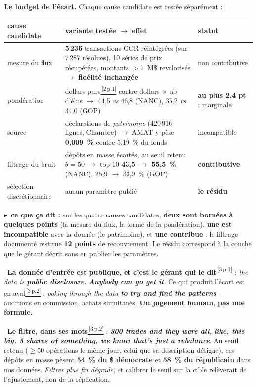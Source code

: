 \documentclass[9pt,a4paper]{extarticle}
\newcommand{\obs}[1]{\vspace{0.2mm}\hangindent=3.4mm\hangafter=0{\color{bleu}\footnotesize\textbullet}~{\small #1}\par\vspace{0.2mm}}
\newcommand{\lire}[1]{{\scriptsize\color{vert}$\blacktriangleright$~\textbf{ce que ça dit :} #1}\par}
\newcommand{\rf}[3]{\href{docs_nanc_gop/#2\#page=#3}{\color{bleu}\textsuperscript{\,[#1\,p.#3]}}}
\newcommand{\sCoop}[1]{\rf{2}{2-cooper-la-regle-du-gerant-20231119.pdf}{#1}}
\newcommand{\sVen}[1]{\rf{3}{3-podcast-Venuto-mecanique-20241206.pdf}{#1}}
\begin{document}
\begin{multicols}{2}
\textbf{Le budget de l'écart.} Chaque cause candidate est testée séparément :
\begin{center}\scriptsize
\begin{tabular}{@{}R{16mm} R{25mm} R{16mm}@{}}
\toprule
cause candidate & variante testée $\to$ effet & statut \\
\midrule
mesure du flux & \textbf{5\,236} transactions OCR réintégrées (sur 7\,287 résolues), 10 séries de prix récupérées, montants \og{}$>$1~M\$\fg{} revalorisés $\to$ \textbf{fidélité inchangée} & non contributive \\
pondération & dollars purs\sCoop{1} contre dollars $\times$ nb d'élus $\to$ 44,5 \emph{vs} 46,8 (NANC), 35,2 \emph{vs} 34,0 (GOP) & \textbf{au plus 2,4 pt} : marginale \\
source & déclarations de \emph{patrimoine} (420\,916 lignes, Chambre) $\to$ AMAT y pèse \textbf{0,009~\%} contre 5,19~\% du fonds & incompatible \\
filtrage du bruit & dépôts en masse écartés, au seuil retenu $\theta=50$ $\to$ top-10 \textbf{43,5 $\to$ 55,5~\%} (NANC), 25,9 $\to$ 33,9~\% (GOP) & \textbf{contributive} \\
\midrule
sélection discrétionnaire & aucun paramètre publié & \textbf{le résidu} \\
\bottomrule
\end{tabular}
\end{center}
\lire{sur les quatre causes candidates, \textbf{deux sont bornées à quelques points} (la mesure du flux, la forme de la pondération), \textbf{une est incompatible} avec la donnée (le patrimoine), et \textbf{une contribue} : le filtrage documenté restitue \textbf{12 points} de recouvrement. Le résidu correspond à la couche que le gérant décrit sans en publier les paramètres.}
\obs{\textbf{La donnée d'entrée est publique, et c'est le gérant qui le dit}\sVen{1} : \og{}\emph{the data is \textbf{public disclosure}. \textbf{Anybody can go get it}}\fg{}. Ce qui produit l'écart est en aval\sVen{2} : \og{}\emph{poking through the data \textbf{to try and find the patterns}}\fg{} --- auditions en commission, achats simultanés. \textbf{Un jugement humain, pas une formule.}}
\obs{\textbf{Le filtre, dans ses mots}\sVen{2} : \og{}\emph{\textbf{300 trades and they were all, like, this big, 5 shares of something, we know that's just a rebalance}}\fg{}. Au seuil retenu ($\ge$50 opérations le même jour, celui que sa description désigne), ces dépôts en masse pèsent \textbf{54~\% du \$ démocrate} et \textbf{58~\% du républicain} dans nos données. \emph{Filtrer plus fin dégrade}, et calibrer le seuil sur la cible relèverait de l'ajustement, non de la réplication.}


\end{multicols}
\end{document}
